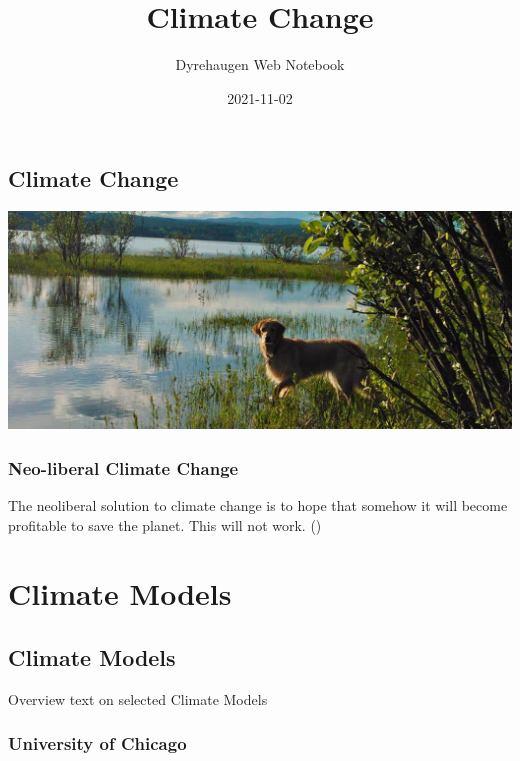 \documentclass[
]{book}
\title{Climate Change}
\author{Dyrehaugen Web Notebook}
\date{2021-11-02}
\begin{document}
\maketitle

{
\setcounter{tocdepth}{1}
\tableofcontents
}
\hypertarget{climate-change}{%
\chapter{Climate Change}\label{climate-change}}

\includegraphics{fig/zelda.jpg}

\hypertarget{neo-liberal-climate-change}{%
\section{Neo-liberal Climate Change}\label{neo-liberal-climate-change}}

The neoliberal solution to climate change is to hope
that somehow it will become profitable to save the planet.
This will not work.
(\citet{ExistentialComics})

\hypertarget{part-climate-models}{%
\part{Climate Models}\label{part-climate-models}}

\hypertarget{climate-models}{%
\chapter{Climate Models}\label{climate-models}}

Overview text on selected Climate Models

\hypertarget{university-of-chicago}{%
\section{University of Chicago}\label{university-of-chicago}}
\end{document}
